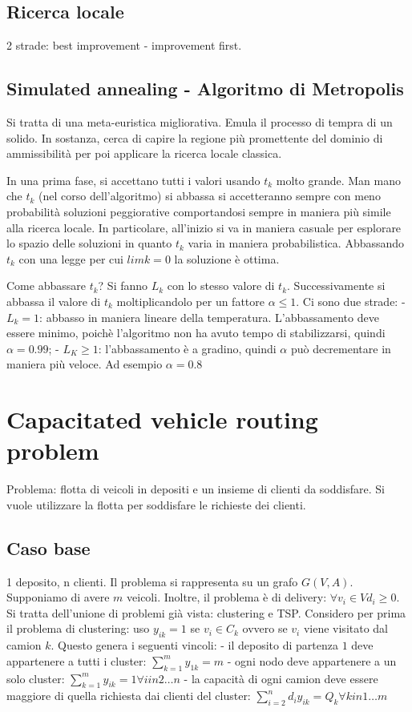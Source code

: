 \documentclass{article}
\begin{document}
\subsection{Ricerca locale}
2 strade: best improvement - improvement first.


\subsection{Simulated annealing - Algoritmo di Metropolis}
Si tratta di una meta-euristica migliorativa. Emula il processo di tempra di un 
solido. In sostanza, cerca di capire la regione più promettente del dominio di 
ammissibilità per poi applicare la ricerca locale classica.

In una prima fase, si accettano tutti i valori usando $t_k$ molto grande. Man 
mano che $t_k$ (nel corso dell'algoritmo) si abbassa si accetteranno sempre con 
meno probabilità soluzioni peggiorative comportandosi sempre in maniera più 
simile alla ricerca locale. In particolare, all'inizio si va in maniera casuale
per esplorare lo spazio delle soluzioni in quanto $t_k$ varia in maniera 
probabilistica. Abbassando $t_k$ con una legge per cui $lim k = 0$ la soluzione 
è ottima.

Come abbassare $t_k$? Si fanno $L_k$ con lo stesso valore di $t_k$. 
Successivamente si abbassa il  valore di $t_k$ moltiplicandolo per un fattore 
$\alpha \leq 1$. Ci sono due strade:
-$L_k = 1$: abbasso in maniera lineare della temperatura. L'abbassamento deve 
essere minimo, poichè l'algoritmo non ha avuto tempo di stabilizzarsi, quindi 
$\alpha = 0.99$;
- $L_K \geq 1$: l'abbassamento è a gradino, quindi $\alpha$ può decrementare in 
maniera più veloce. Ad esempio $\alpha = 0.8$

\section{Capacitated vehicle routing problem}
Problema: flotta di veicoli in depositi e un insieme di clienti da soddisfare. 
Si vuole utilizzare la flotta per soddisfare le richieste dei clienti.

\subsection{Caso base}
1 deposito, n clienti. Il problema si rappresenta su un grafo $G(V,A)$. Supponiamo 
di avere $m$ veicoli. Inoltre, il problema è di delivery: $\forall v_i \in V 
d_i \geq 0$.
Si tratta dell'unione di problemi già vista: clustering e TSP.
Considero per prima il problema di clustering: uso $y_{ik} = 1$ se $v_i \in C_k$
ovvero se $v_i$ viene visitato dal camion $k$. Questo genera i seguenti vincoli:
- il deposito di partenza $1$ deve appartenere a tutti i cluster: 
$\sum_{k=1}^m y_{1k} = m $
- ogni nodo deve appartenere a un solo cluster: 
$\sum_{k=1}^m y_{ik} = 1  \forall i in {2\ldots n}$
- la capacità di ogni camion deve essere maggiore di quella richiesta dai clienti 
del cluster:
$\sum_{i=2}^n d_i y_{ik} = Q_k \forall k in {1\ldots m}$
\end{document}
